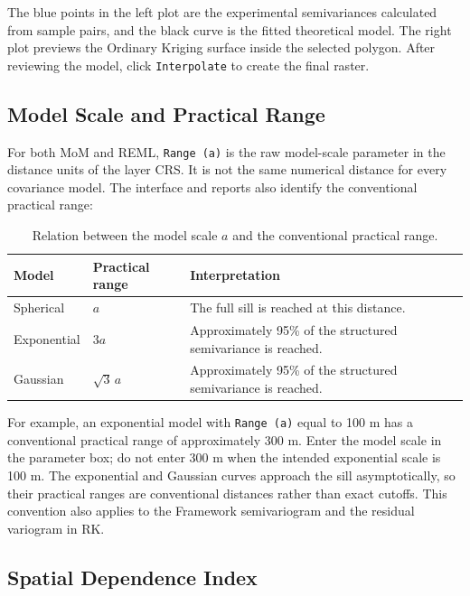 \documentclass[11pt,a4paper]{article}
\begin{document}
The blue points in the left plot are the experimental semivariances calculated from sample pairs, and the black curve is the fitted theoretical model. The right plot previews the Ordinary Kriging surface inside the selected polygon. After reviewing the model, click \texttt{Interpolate} to create the final raster.

\subsection{Model Scale and Practical Range}
\label{sec:model-range}

For both MoM and REML, \texttt{Range (a)} is the raw model-scale parameter in the distance units of the layer CRS. It is not the same numerical distance for every covariance model. The interface and reports also identify the conventional practical range:

\begin{table}[H]
\centering
\caption{Relation between the model scale $a$ and the conventional practical range.}
\label{tab:practical-range}
\begin{tabularx}{0.96\textwidth}{P{2.8cm}P{3.2cm}Y}
\toprule
\textbf{Model} & \textbf{Practical range} & \textbf{Interpretation} \\
\midrule
Spherical & $a$ & The full sill is reached at this distance. \\
Exponential & $3a$ & Approximately 95\% of the structured semivariance is reached. \\
Gaussian & $\sqrt{3}\,a$ & Approximately 95\% of the structured semivariance is reached. \\
\bottomrule
\end{tabularx}
\end{table}

For example, an exponential model with \texttt{Range (a)} equal to 100 m has a conventional practical range of approximately 300 m. Enter the model scale in the parameter box; do not enter 300 m when the intended exponential scale is 100 m. The exponential and Gaussian curves approach the sill asymptotically, so their practical ranges are conventional distances rather than exact cutoffs. This convention also applies to the Framework semivariogram and the residual variogram in RK.

\subsection{Spatial Dependence Index}
\end{document}
